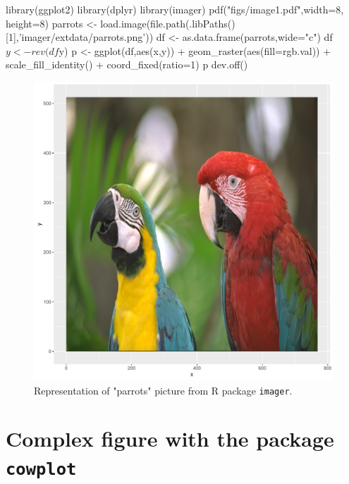\documentclass[a4paper,10pt]{article}
\begin{document}
\begin{Schunk}
\begin{Sinput}
  library(ggplot2)
  library(dplyr)
  library(imager)
  pdf("figs/image1.pdf",width=8, height=8)
  parrots <- load.image(file.path(.libPaths()[1],'imager/extdata/parrots.png'))
  df <- as.data.frame(parrots,wide="c") %
  df$y <- rev(df$y)
  p <- ggplot(df,aes(x,y)) + geom_raster(aes(fill=rgb.val)) + scale_fill_identity() + coord_fixed(ratio=1)
  p
  dev.off()
\end{Sinput}
\end{Schunk}

\begin{figure}[H]
\begin{center}
\includegraphics[scale=0.5,page=1]{figs/image1.pdf}
\caption{Representation of "parrots" picture from R package \texttt{imager}.}
\label{fig:image1}
\end{center}
\end{figure}


\section{Complex figure with the package \texttt{cowplot}}
\end{document}
